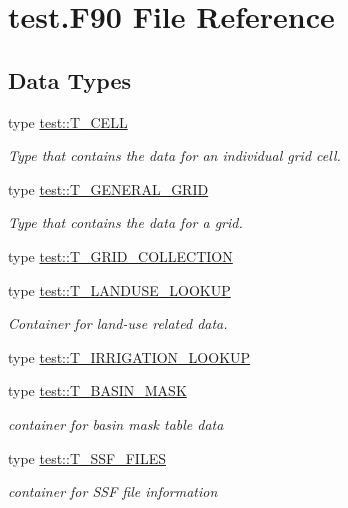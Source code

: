 \hypertarget{test_8_f90}{
\section{test.F90 File Reference}
\label{test_8_f90}
}
\subsection*{Data Types}
\begin{DoxyCompactItemize}
\item 
type \hyperlink{typetest_1_1_t___c_e_l_l}{test::T\_\-CELL}
\begin{DoxyCompactList}\small\item\em Type that contains the data for an individual grid cell. \item\end{DoxyCompactList}\item 
type \hyperlink{typetest_1_1_t___g_e_n_e_r_a_l___g_r_i_d}{test::T\_\-GENERAL\_\-GRID}
\begin{DoxyCompactList}\small\item\em Type that contains the data for a grid. \item\end{DoxyCompactList}\item 
type \hyperlink{typetest_1_1_t___g_r_i_d___c_o_l_l_e_c_t_i_o_n}{test::T\_\-GRID\_\-COLLECTION}
\item 
type \hyperlink{typetest_1_1_t___l_a_n_d_u_s_e___l_o_o_k_u_p}{test::T\_\-LANDUSE\_\-LOOKUP}
\begin{DoxyCompactList}\small\item\em Container for land-\/use related data. \item\end{DoxyCompactList}\item 
type \hyperlink{typetest_1_1_t___i_r_r_i_g_a_t_i_o_n___l_o_o_k_u_p}{test::T\_\-IRRIGATION\_\-LOOKUP}
\item 
type \hyperlink{typetest_1_1_t___b_a_s_i_n___m_a_s_k}{test::T\_\-BASIN\_\-MASK}
\begin{DoxyCompactList}\small\item\em container for basin mask table data \item\end{DoxyCompactList}\item 
type \hyperlink{typetest_1_1_t___s_s_f___f_i_l_e_s}{test::T\_\-SSF\_\-FILES}
\begin{DoxyCompactList}\small\item\em container for SSF file information \item\end{DoxyCompactList}\item 

\end{DoxyCompactItemize}
